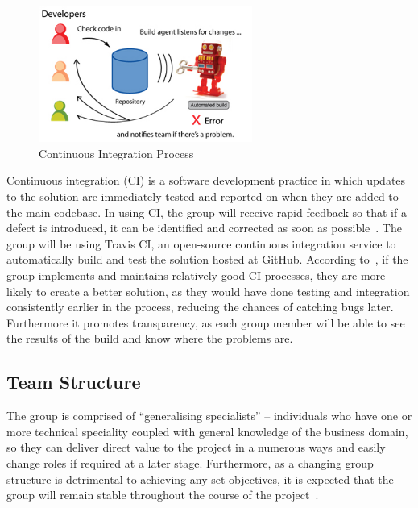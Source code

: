 \begin{figure}
  \centering
  \begin{minipage}{7cm}
    \centering
    \includegraphics[width=7cm]{inc/continuous_integration_process.jpg}
    \caption{Continuous Integration Process}
    \label{fig:continuous_integration_process}
  \end{minipage}
\end{figure}

Continuous integration (CI) is a software development practice in which updates to the solution are immediately tested and reported on when they are added to the main codebase. In using CI, the group will receive rapid feedback so that if a defect is introduced, it can be identified and corrected as soon as possible~\parencite{web:behaviour_driven_development}. The group will be using Travis CI, an open-source continuous integration service to automatically build and test the solution hosted at GitHub. According to~\textcite{book:ci_NET}, if the group implements and maintains relatively good CI processes, they are more likely to create a better solution, as they would have done testing and integration consistently earlier in the process, reducing the chances of catching bugs later. Furthermore it promotes transparency, as each group member will be able to see the results of the build and know where the problems are.

\subsection{Team Structure}

The group is comprised of ``generalising specialists'' -- individuals who have one or more technical speciality coupled with general knowledge of the business domain, so they can deliver direct value to the project in a numerous ways and easily change roles if required at a later stage. Furthermore, as a changing group structure is detrimental to achieving any set objectives, it is expected that the group will remain stable throughout the course of the project~\parencite{book:agile_development}.

